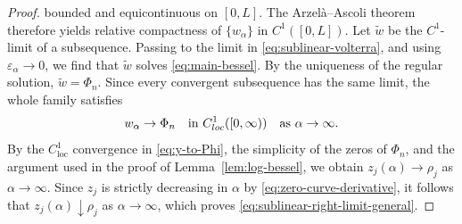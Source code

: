 \documentclass[10pt,a4paper]{amsart}
\begin{document}
\begin{proof}
bounded and equicontinuous on $[0,L]$. The Arzel\`{a}--Ascoli theorem
therefore yields relative compactness of $\{w_\alpha\}$ in
$C^1([0,L])$. Let $\tilde w$ be the $C^1$-limit of
a subsequence. Passing to the limit in \eqref{eq:sublinear-volterra}, and using
$\varepsilon_{\alpha}\to0$, we find that $\tilde w$ solves \eqref{eq:main-bessel}. By the uniqueness of the regular solution, $\tilde w=\Phi_n$. Since every convergent subsequence has the same limit, the whole family satisfies
\begin{equation}\label{eq:y-to-Phi}
w_\alpha\rightarrow\Phi_n\quad \text{in }C^1_{\rm loc}([0,\infty)){\quad\text{as }\alpha\to\infty}.
\end{equation}
By the $C^1_{\mathrm{loc}}$ convergence in \eqref{eq:y-to-Phi}, the simplicity of the zeros of $\Phi_n$, and the argument used in the proof of Lemma~\ref{lem:log-bessel}, we obtain
 $z_j(\alpha)\rightarrow\rho_j$ as $\alpha\to\infty$. Since $z_j$ is strictly decreasing in $\alpha$ by \eqref{eq:zero-curve-derivative}, it follows that $z_j(\alpha)\downarrow\rho_j$ as $\alpha\to\infty$,
which proves \eqref{eq:sublinear-right-limit-general}.


\end{proof}
\end{document}
